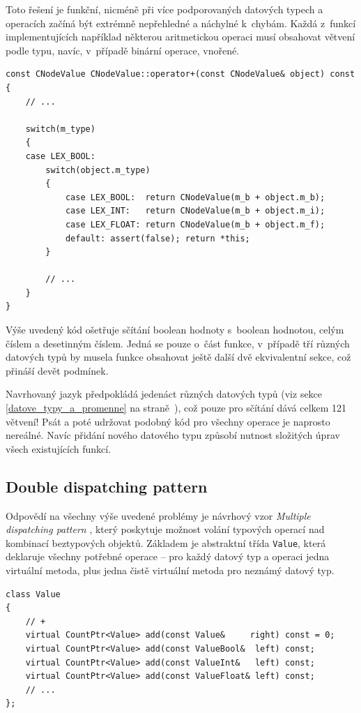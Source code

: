 \documentclass[11pt,twoside,a4paper]{book}
\begin{document}
Toto řešení je funkční, nicméně při více podporovaných datových typech a operacích začíná být extrémně nepřehledné a náchylné k~chybám. Každá z~funkcí implementujících například některou aritmetickou operaci musí obsahovat větvení podle typu, navíc, v~případě binární operace, vnořené.

\begin{verbatim}
const CNodeValue CNodeValue::operator+(const CNodeValue& object) const
{
    // ...

    switch(m_type)
    {
    case LEX_BOOL:
        switch(object.m_type)
        {
            case LEX_BOOL:  return CNodeValue(m_b + object.m_b);
            case LEX_INT:   return CNodeValue(m_b + object.m_i);
            case LEX_FLOAT: return CNodeValue(m_b + object.m_f);
            default: assert(false); return *this;
        }

        // ...
    }
}
\end{verbatim}

Výše uvedený kód ošetřuje sčítání boolean hodnoty s~boolean hodnotou, celým číslem a desetinným číslem. Jedná se pouze o~část funkce, v~případě tří různých datových typů by musela funkce obsahovat ještě další dvě ekvivalentní sekce, což přináší devět podmínek.

Navrhovaný jazyk předpokládá jedenáct různých datových typů (viz sekce \ref{datove_typy_a_promenne} na straně~\pageref{datove_typy_a_promenne}), což pouze pro sčítání dává celkem 121 větvení! Psát a poté udržovat podobný kód pro všechny operace je naprosto nereálné. Navíc přidání nového datového typu způsobí nutnost slo\-ži\-tých úprav všech existujících funkcí.


\subsection{Double dispatching pattern}
\label{double_dispatching_pattern}

Odpovědí na všechny výše uvedené problémy je návrhový vzor \textit{Multiple dispatching pattern} \cite[str. 679]{eckel}, který poskytuje možnost volání typových operací nad kombinací beztypových objektů. Základem je abstraktní třída \texttt{Value}, která deklaruje všechny potřebné operace -- pro každý datový typ a operaci jedna virtuální metoda, plus jedna čistě virtuální metoda pro neznámý datový typ.

\begin{verbatim}
class Value
{
    // +
    virtual CountPtr<Value> add(const Value&     right) const = 0;
    virtual CountPtr<Value> add(const ValueBool&  left) const;
    virtual CountPtr<Value> add(const ValueInt&   left) const;
    virtual CountPtr<Value> add(const ValueFloat& left) const;
    // ...
};
\end{verbatim}
\end{document}
